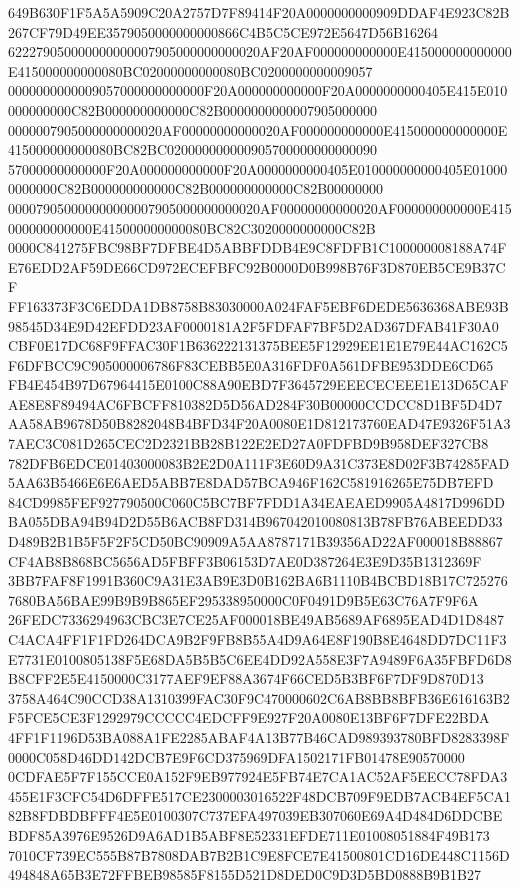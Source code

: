 \documentclass[UTF8,fontset=fandol,zihao=-4,a4paper]{ctexart}
\begin{document}
{{649B630F1F5A5A5909C20A2757D7F89414F20A0000000000909DDAF4E923C82B267CF79D49EE3579050000000000866C4B5C5CE972E5647D56B16264
622279050000000000007905000000000020AF20AF000000000000E415000000000000E415000000000080BC02000000000080BC0200000000009057
0000000000009057000000000000F20A000000000000F20A0000000000405E415E010000000000C82B000000000000C82B0000000000007905000000
0000007905000000000020AF00000000000020AF000000000000E415000000000000E415000000000080BC82BC020000000000905700000000000090
57000000000000F20A000000000000F20A0000000000405E010000000000405E010000000000C82B000000000000C82B000000000000C82B00000000
000079050000000000007905000000000020AF00000000000020AF000000000000E415000000000000E415000000000080BC82C3020000000000C82B
0000C841275FBC98BF7DFBE4D5ABBFDDB4E9C8FDFB1C100000008188A74FE76EDD2AF59DE66CD972ECEFBFC92B0000D0B998B76F3D870EB5CE9B37CF
FF163373F3C6EDDA1DB8758B83030000A024FAF5EBF6DEDE5636368ABE93B98545D34E9D42EFDD23AF0000181A2F5FDFAF7BF5D2AD367DFAB41F30A0
CBF0E17DC68F9FFAC30F1B636222131375BEE5F12929EE1E1E79E44AC162C5F6DFBCC9C905000006786F83CEBB5E0A316FDF0A561DFBE953DDE6CD65
FB4E454B97D67964415E0100C88A90EBD7F3645729EEECECEEE1E13D65CAFAE8E8F89494AC6FBCFF810382D5D56AD284F30B00000CCDCC8D1BF5D4D7
AA58AB9678D50B8282048B4BFD34F20A0080E1D812173760EAD47E9326F51A37AEC3C081D265CEC2D2321BB28B122E2ED27A0FDFBD9B958DEF327CB8
782DFB6EDCE01403000083B2E2D0A111F3E60D9A31C373E8D02F3B74285FAD5AA63B5466E6E6AED5ABB7E8DAD57BCA946F162C581916265E75DB7EFD
84CD9985FEF927790500C060C5BC7BF7FDD1A34EAEAED9905A4817D996DDBA055DBA94B94D2D55B6ACB8FD314B967042010080813B78FB76ABEEDD33
D489B2B1B5F5F2F5CD50BC90909A5AA8787171B39356AD22AF000018B88867CF4AB8B868BC5656AD5FBFF3B06153D7AE0D387264E3E9D35B1312369F
3BB7FAF8F1991B360C9A31E3AB9E3D0B162BA6B1110B4BCBD18B17C7252767680BA56BAE99B9B9B865EF295338950000C0F0491D9B5E63C76A7F9F6A
26FEDC7336294963CBC3E7CE25AF000018BE49AB5689AF6895EAD4D1D8487C4ACA4FF1F1FD264DCA9B2F9FB8B55A4D9A64E8F190B8E4648DD7DC11F3
E7731E0100805138F5E68DA5B5B5C6EE4DD92A558E3F7A9489F6A35FBFD6D8B8CFF2E5E4150000C3177AEF9EF88A3674F66CED5B3BF6F7DF9D870D13
3758A464C90CCD38A1310399FAC30F9C470000602C6AB8BB8BFB36E616163B2F5FCE5CE3F1292979CCCCC4EDCFF9E927F20A0080E13BF6F7DFE22BDA
4FF1F1196D53BA088A1FE2285ABAF4A13B77B46CAD989393780BFD8283398F0000C058D46DD142DCB7E9F6CD375969DFA1502171FB01478E90570000
0CDFAE5F7F155CCE0A152F9EB977924E5FB74E7CA1AC52AF5EECC78FDA3455E1F3CFC54D6DFFE517CE2300003016522F48DCB709F9EDB7ACB4EF5CA1
82B8FDBDBFFF4E5E0100307C737EFA497039EB307060E69A4D484D6DDCBEBDF85A3976E9526D9A6AD1B5ABF8E52331EFDE711E01008051884F49B173
7010CF739EC555B87B7808DAB7B2B1C9E8FCE7E41500801CD16DE448C1156D494848A65B3E72FFBEB98585F8155D521D8DED0C9D3D5BD0888B9B1B27
}}
\end{document}
